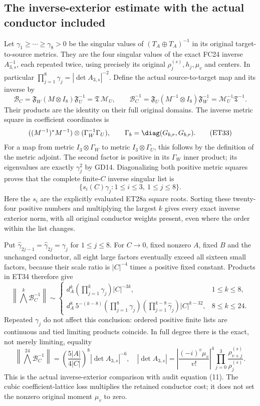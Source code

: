 \subsection{The inverse-exterior estimate with the actual conductor included}
Let $\gamma_1\ge\cdots\ge\gamma_8>0$ be the singular values of
$(T_A\oplus T_A)^{-1}$ in its original target-to-source metrics.
They are the four singular values of the exact FC24 inverse
$A_{3,s}^{-1}$, each repeated twice, using precisely its original
$\rho_j^{(s)},h_j,\mu_v$ and centers. In particular
$\prod_{j=1}^8\gamma_j=|\det A_{3,s}|^{-2}$.
Define the actual source-to-target map and its inverse by
\[
 \mathcal B_C=\mathfrak F_W(M\otimes I_8)\mathfrak F_U^{-1}
             =\mathfrak T\,\mathcal M_U,\qquad
 \mathcal B_C^{-1}=\mathfrak F_U(M^{-1}\otimes I_8)
                  \mathfrak F_W^{-1}
             =\mathcal M_U^{-1}\mathfrak T^{-1}.
 \tag{ET32}
\]
Their products are the identity on their full original domains.
The inverse metric square in coefficient coordinates is
\[
 ((M^{-1})^*M^{-1})\otimes
       (\Gamma_W^{-1}\Gamma_U),\qquad
 \Gamma_b=\diag(G_{b,r},G_{b,r}) .
 \tag{ET33}
\]
For a map from metric $I_3\otimes\Gamma_W$ to metric
$I_3\otimes\Gamma_U$, this follows by the definition of the metric
adjoint. The second factor is positive in its $\Gamma_W$ inner product;
its eigenvalues are exactly $\gamma_j^2$ by GD14.
Diagonalizing both positive metric squares proves that the complete
finite-$C$ inverse singular list is
\[
 \{s_i(C)\gamma_j:1\le i\le3,\ 1\le j\le8\}.
 \tag{ET34}
\]
Here the $s_i$ are the explicitly evaluated ET28a square roots.
Sorting these twenty-four positive numbers and multiplying the largest
$k$ gives every exact inverse exterior norm, with all original conductor
weights present, even where the order within the list changes.

Put $\widehat\gamma_{2j-1}=\widehat\gamma_{2j}=\gamma_j$ for
$1\le j\le8$. For $C\to0$, fixed nonzero $A$, fixed $B$ and the
unchanged conductor, all eight large factors eventually exceed
all sixteen small factors, because their scale ratio is $|C|^{-4}$
times a positive fixed constant. Products in ET34 therefore give
\[
 \left\|\bigwedge^k\mathcal B_C^{-1}\right\|\sim
 \begin{cases}
 d_A^k\left(\prod_{j=1}^k\gamma_j\right)|C|^{-3k},
                    &1\le k\le8,\\[3pt]
 d_A^8\,5^{-(k-8)}
 \left(\prod_{j=1}^8\gamma_j\right)
 \left(\prod_{j=1}^{k-8}\widehat\gamma_j\right)|C|^{k-32},
                    &8\le k\le24 .
 \end{cases}
 \tag{ET35}
\]
Repeated $\gamma_j$ do not affect this conclusion: ordered positive
finite lists are continuous and tied limiting products coincide.
In full degree there is the exact, not merely limiting, equality
\[
 \left\|\bigwedge^{24}\mathcal B_C^{-1}\right\|
 =\left(\frac{5|A|}{4|C|}\right)^8|\det A_{3,s}|^{-6},
 \quad
 |\det A_{3,s}|=
 \left|\frac{(-i)^v\mu_v}{v!}\right|^4
 \prod_{j=0}^3\frac{\rho_{v+j}^{(s)}}{\rho_j^{(s)}} .
 \tag{ET36}
\]
This is the actual inverse-exterior comparison with audit equation (11).
The cubic coefficient-lattice loss multiplies the retained conductor
cost; it does not set the nonzero original moment $\mu_v$ to zero.

